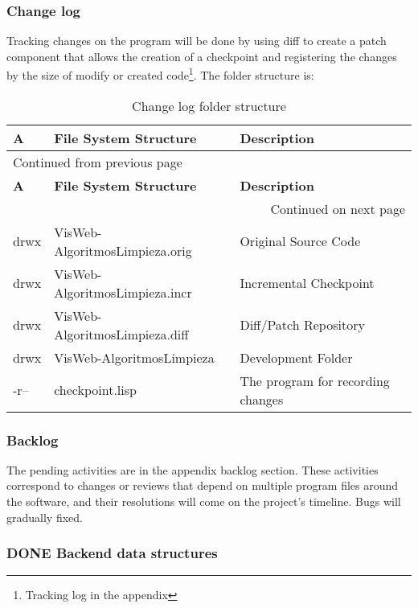 \documentclass[a4paper]{article}
\begin{document}
\subsubsection{Change log}
\label{sec:org80a3616}

Tracking changes on the program will be done by using diff to create a patch component that allows the creation of a checkpoint and registering the changes by the size of modify or created code\footnote{Tracking log in the appendix}. The folder structure is:

\sffamily
\begin{longtable}{lll}
\caption{Change log folder structure}
\\[0pt]
\textbf{A} & \textbf{File System Structure} & \textbf{Description}\\[0pt]
\hline
\endfirsthead
\multicolumn{3}{l}{Continued from previous page} \\[0pt]
\hline

\textbf{A} & \textbf{File System Structure} & \textbf{Description} \\[0pt]

\hline
\endhead
\hline\multicolumn{3}{r}{Continued on next page} \\
\endfoot
\endlastfoot
\hline
drwx & VisWeb-AlgoritmosLimpieza.orig & Original Source Code\\[0pt]
drwx & VisWeb-AlgoritmosLimpieza.incr & Incremental Checkpoint\\[0pt]
drwx & VisWeb-AlgoritmosLimpieza.diff & Diff/Patch Repository\\[0pt]
drwx & VisWeb-AlgoritmosLimpieza & Development Folder\\[0pt]
-r-- & checkpoint.lisp & The program for recording changes\\[0pt]
\end{longtable}
\rmfamily

\subsubsection{Backlog}
\label{sec:org7175768}

The pending activities are in the appendix backlog section. These activities correspond to changes or reviews that depend on multiple program files around the software, and their resolutions will come on the project's timeline. Bugs will gradually fixed.

\subsubsection{{\bfseries\sffamily DONE} Backend data structures}
\label{sec:org449a143}
\end{document}
